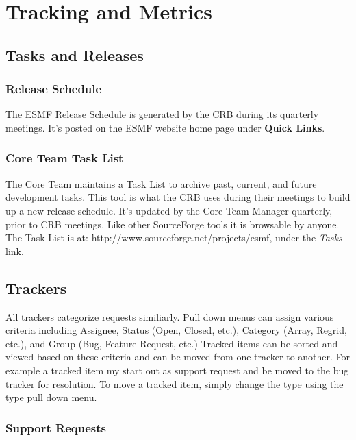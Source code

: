 
\section{Tracking and Metrics}
\label{sec:tracking}

\subsection{Tasks and Releases}
\label{sec:build}

\subsubsection{Release Schedule}
The ESMF Release Schedule is generated by the CRB during its
quarterly meetings.  It's posted on the ESMF website home
page under {\bf Quick Links}.

\subsubsection{Core Team Task List}

The Core Team maintains a Task List to archive past, current,
and future development tasks.  This tool is
what the CRB uses during their meetings to build up a new
release schedule.  It's updated by the Core Team Manager 
quarterly, prior to CRB meetings.  Like other SourceForge
tools it is browsable by anyone.  The Task List is at:  
{http://www.sourceforge.net/projects/esmf}, under the 
{\it Tasks} link. 

\subsection{Trackers}
\label{sec:tracking_tools}

All trackers categorize requests similiarly. Pull down menus
can assign various criteria including Assignee, 
Status (Open, Closed, etc.), Category (Array, Regrid, etc.), and
Group (Bug, Feature Request, etc.)  Tracked items can be sorted and
viewed based on these criteria and can be moved from one tracker to another. For example
a tracked item my start out as support request and be moved to the bug tracker for resolution.  
To move a tracked item, simply change the type using the type pull down menu. 

\subsubsection{Support Requests}

